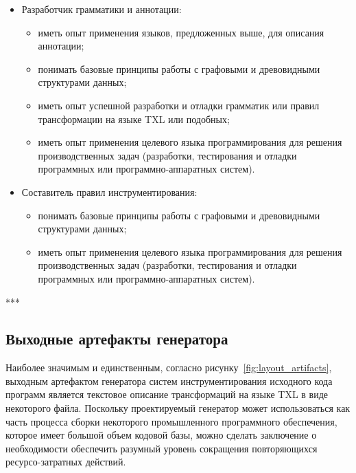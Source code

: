 \begin{itemize}[noitemsep]
  \item Разработчик грамматики и аннотации:
    \begin{itemize}[noitemsep]
      \item иметь опыт применения языков, предложенных выше, для описания аннотации;
      \item понимать базовые принципы работы с графовыми и древовидными структурами данных;
      \item иметь опыт успешной разработки и отладки грамматик или правил трансформации на языке TXL или подобных;
      \item иметь опыт применения целевого языка программирования для решения производственных задач (разработки, тестирования и отладки программных или программно-аппаратных систем).
    \end{itemize}

  \item Составитель правил инструментирования:
    \begin{itemize}[noitemsep]
      \item понимать базовые принципы работы с графовыми и древовидными структурами данных;
      \item иметь опыт применения целевого языка программирования для решения производственных задач (разработки, тестирования и отладки программных или программно-аппаратных систем).
    \end{itemize}
\end{itemize}

***

\subsection{Выходные артефакты генератора}

Наиболее значимым и единственным, согласно рисунку~\ref{fig:layout_artifacts}, выходным артефактом генератора систем инструментирования исходного кода программ является текстовое описание трансформаций на языке TXL в виде некоторого файла.
Поскольку проектируемый генератор может использоваться как часть процесса сборки некоторого промышленного программного обеспечения, которое имеет большой объем кодовой базы, можно сделать заключение о необходимости обеспечить разумный уровень сокращения повторяющихся ресурсо-затратных действий.

